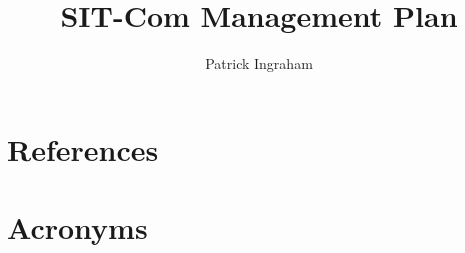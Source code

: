 \documentclass[SE,toc]{lsstdoc}
\title{SIT-Com Management Plan}
\author{%
Patrick Ingraham
}
\date{\vcsDate}
\begin{document}
\maketitle


\appendix

\section{References} \label{sec:bib}
\renewcommand{\refname}{} %


\section{Acronyms} \label{sec:acronyms}

\end{document}
